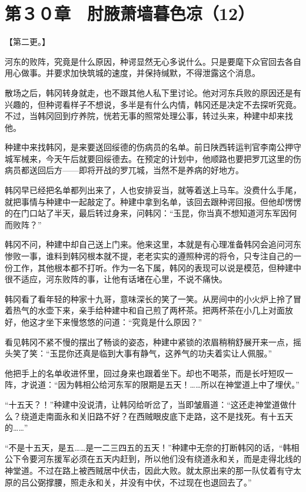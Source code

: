 \section{第３０章　肘腋萧墙暮色凉（12）}

【第二更。】

河东的败阵，究竟是什么原因，种谔显然无心多说什么。只是要麾下众官回去各自用心做事。并要求加快筑城的速度，并保持缄默，不得泄露这个消息。

散场之后，韩冈转身就走，也不跟其他人私下里讨论。他对河东兵败的原因还是有兴趣的，但种谔看样子不想说，多半是有什么内情，韩冈还是决定不去探听究竟。不过，当韩冈回到疗养院，恍若无事的照常处理公事，转过头来，种建中却来找他。

种建中来找韩冈，是来要送回绥德的伤病员的名单。前日陕西转运判官李南公押守城军械来，今天午后就要回绥德去。在预定的计划中，他顺路也要把罗兀这里的伤病员都送回后方——即将开战的罗兀城，当然不是养病的好地方。

韩冈早已经把名单都列出来了，人也安排妥当，就等着送上马车。没费什么手尾，就把事情与种建中一起敲定了。种建中拿到名单，该回去跟种谔回报。但他却愣愣的在门口站了半天，最后转过身来，问韩冈：“玉昆，你当真不想知道河东军因何而败阵？”

韩冈不问，种建中却自己送上门来。他来这里，本就是有心理准备韩冈会追问河东惨败一事，谁料到韩冈根本就不提，老老实实的遵照种谔的将令，只专注自己的一份工作，其他根本都不打听。作为一名下属，韩冈的表现可以说是模范，但种建中很不适应，河东败阵的事，让他有话堵在心里，不说不痛快。

韩冈看了看年轻的种家十九哥，意味深长的笑了一笑。从房间中的小火炉上拎了冒着热气的水壶下来，亲手给种建中和自己煎了两杯茶。把两杯茶在小几上对面放好，他这才坐下来慢悠悠的问道：“究竟是什么原因？”

看见韩冈不紧不慢的摆出了畅谈的姿态，种建中紧锁的浓眉稍稍舒展开来一点，摇头笑了笑：“玉昆你还真是临到大事有静气，这养气的功夫着实让人佩服。”

他把手上的名单收进怀里，回过身来也跟着坐下。却也不喝茶，而是长吁短叹一阵，才说道：“因为韩相公给河东军的限期是五天！……所以在神堂道上中了埋伏。”

“十五天？！”种建中没说清，让韩冈给听岔了，当即皱眉道：“这还走神堂道做什么？绕道走南面永和关旧路不好？在西贼眼皮底下走路，这不是找死。有十五天的……”

“不是十五天，是五……是一二三四五的五天！”种建中无奈的打断韩冈的话，“韩相公下令要河东援军必须在五天内赶到，所以他们没有绕道永和关，而是走得北线的神堂道。不过在路上被西贼居中伏击，因此大败。就太原出来的那一队仗着有守太原的吕公弼撑腰，照走永和关，并没有中伏，不过现在也退回去了。”

